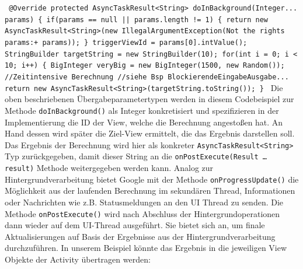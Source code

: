\documentclass[12pt,oneside,a4paper,bibtotoc,liststotoc]{scrreprt}
\begin{document}
\texttt{\newline
@Override\newline
  protected AsyncTaskResult<String> doInBackground(Integer... params)\newline
  \{\newline
     if(params == null || params.length != 1)\newline
    \{\newline
        return new AsyncTaskResult<String>(new IllegalArgumentException(\grqq Not the rights params:\grqq + params));\newline
    \}\newline
     triggerViewId = params[0].intValue();\newline
\newline
     StringBuilder targetString = new StringBuilder(10);\newline
     for(int i = 0; i < 10; i++)\newline
    \{\newline
\newline
BigInteger veryBig = new BigInteger(1500, new Random());  //Zeitintensive Berechnung \newline
           //siehe Bsp BlockierendeEingabeAusgabe...\newline
     return new AsyncTaskResult<String>(targetString.toString());\newline
 \}\newline
}\newline
Die oben beschriebenen Übergabeparametertypen werden in diesem Codebeispiel zur Methode \texttt{doInBackground()} als Integer konkretisiert und spezifizieren in der Implementierung die ID der View, welche die Berechnung angestoßen hat. An Hand dessen wird später die Ziel-View ermittelt, die das Ergebnis darstellen soll. Das Ergebnis der Berechnung wird hier als konkreter \texttt{AsyncTaskResult<String>} Typ zurückgegeben, damit dieser String an die \texttt{onPostExecute(Result … result)} Methode weitergegeben werden kann. Analog zur Hintergrundverarbeitung bietet Google mit der Methode \texttt{onProgressUpdate()} die Möglichkeit aus der laufenden Berechnung im sekundären Thread, Informationen oder Nachrichten wie z.B. Statusmeldungen an den UI Thread zu senden. Die Methode \texttt{onPostExecute()} wird nach Abschluss der Hintergrundoperationen dann wieder auf dem UI-Thread ausgeführt. Sie bietet sich an, um finale Aktualisierungen auf Basis der Ergebnisse aus der Hintergrundverarbeitung durchzuführen. In unserem Beispiel könnte das Ergebnis in die jeweiligen View Objekte der Activity übertragen werden:\newline
\end{document}
